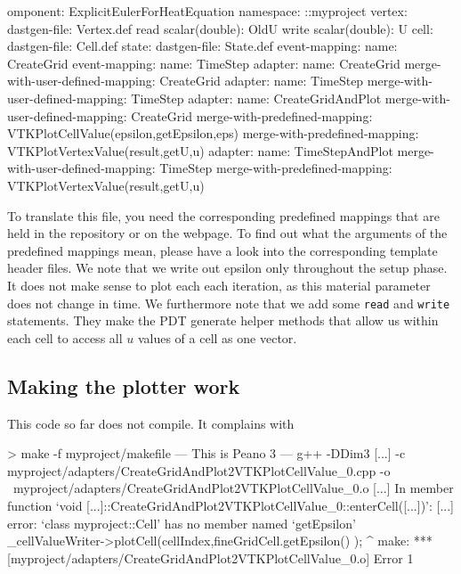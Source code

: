 \begin{code}
omponent: ExplicitEulerForHeatEquation
namespace: ::myproject
vertex:
  dastgen-file: Vertex.def
  read scalar(double): OldU
  write scalar(double): U
cell:
  dastgen-file: Cell.def
state:
  dastgen-file: State.def
event-mapping:
  name: CreateGrid
event-mapping:
  name: TimeStep
adapter:
  name: CreateGrid
  merge-with-user-defined-mapping: CreateGrid
adapter:
  name: TimeStep
  merge-with-user-defined-mapping: TimeStep
adapter:
  name: CreateGridAndPlot
  merge-with-user-defined-mapping: CreateGrid
  merge-with-predefined-mapping: VTKPlotCellValue(epsilon,getEpsilon,eps)
  merge-with-predefined-mapping: VTKPlotVertexValue(result,getU,u)
adapter:
  name: TimeStepAndPlot
  merge-with-user-defined-mapping: TimeStep
  merge-with-predefined-mapping: VTKPlotVertexValue(result,getU,u)
\end{code}

\noindent
To translate this file, you need the corresponding predefined mappings that are 
held in the repository or on the webpage.
To find out what the arguments of the predefined mappings mean, please have a 
look into the corresponding template header files.
We note that we write out epsilon only throughout the setup phase. 
It does not make sense to plot each each iteration, as this material parameter
does not change in time.
We furthermore note that we add some \texttt{read} and \texttt{write}
statements.
They make the PDT generate helper methods that allow us within each cell to
access all $u$ values of a cell as one vector.



\subsection{Making the plotter work}

This code so far does not compile. It complains with

\begin{code}
> make -f myproject/makefile
--- This is Peano 3 ---
g++ -DDim3 [...] -c myproject/adapters/CreateGridAndPlot2VTKPlotCellValue_0.cpp -o \
myproject/adapters/CreateGridAndPlot2VTKPlotCellValue_0.o 
[...]  In member function ‘void [...]::CreateGridAndPlot2VTKPlotCellValue_0::enterCell([...])’:
[...] error: ‘class myproject::Cell’ has no member named ‘getEpsilon’
     _cellValueWriter->plotCell(cellIndex,fineGridCell.getEpsilon() );
                                                       ^
make: *** [myproject/adapters/CreateGridAndPlot2VTKPlotCellValue_0.o] Error 1
\end{code}


